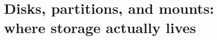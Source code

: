 \chapter{Disks, partitions, and mounts: where storage actually lives}
\label{ch:disks-partitions-and-mounts-where}

